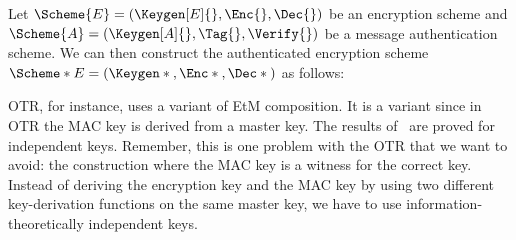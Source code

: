 \begin{definition}\label{EtM}
  Let \(\Scheme{E} = (\Keygen[E]{}, \Enc{}, \Dec{})\) be an encryption scheme 
  and \(\Scheme{A} = (\Keygen[A]{}, \Tag{}, \Verify{})\) be a message 
  authentication scheme.
  We can then construct the authenticated encryption scheme \(\Scheme*{E} 
    = (\Keygen*{}, \Enc*{}, \Dec*{})\) as follows:
  \begin{center}
    \normalfont{}
    \begin{minipage}[t]{0.3\textwidth}
      \begin{algorithmic}
        \Function{$\Keygen*{}$}{}
          \State{$\Key{}\rgets \Keygen[E]{}$}
          \State{$\TagKey{}\rgets \Keygen[A]{}$}
          \State{\Return{$\Key{}\concat \TagKey{}$}}
        \EndFunction{}
      \end{algorithmic}
    \end{minipage}%
    \vline%
    \begin{minipage}[t]{0.33\textwidth}
      \begin{algorithmic}
        \EndFunction{}
      \end{algorithmic}
    \end{minipage}%
    \vline%
    \begin{minipage}[t]{0.33\textwidth}
      \begin{algorithmic}
          \EndIf{}
          \State{\Return{$\bot$}}
        \EndFunction{}
      \end{algorithmic}
    \end{minipage}
  \end{center}
\end{definition}

\ac{OTR}, for instance, uses a variant of \ac{EtM} composition.
It is a variant since in \ac{OTR} the \ac{MAC} key is derived from a master 
key.
The results of~\cite{AuthEncryption} are proved for independent keys.
Remember, this is one problem with the \ac{OTR} that we want to avoid:
the construction where the \ac{MAC} key is a witness for the correct key.
Instead of deriving the encryption key and the \ac{MAC} key by using two 
different key-derivation functions on the same master key, we have to use 
information-theoretically independent keys.

